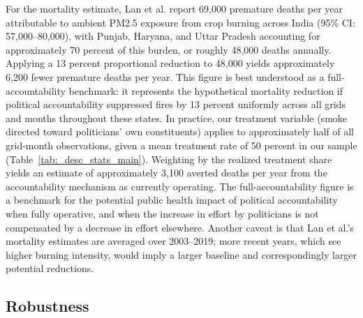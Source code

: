 \documentclass[12pt]{article}
\begin{document}
{For the mortality estimate, Lan et al. report 69,000 premature deaths per year attributable to ambient PM2.5 exposure from crop burning across India (95\% CI: 57,000–80,000), with Punjab, Haryana, and Uttar Pradesh accounting for approximately 70 percent of this burden, or roughly 48,000 deaths annually. Applying a 13 percent proportional reduction to 48,000 yields approximately 6,200 fewer premature deaths per year. This figure is best understood as a full-accountability benchmark: it represents the hypothetical mortality reduction if political accountability suppressed fires by 13 percent uniformly across all grids and months throughout these states. In practice, our treatment variable (smoke directed toward politicians' own constituents) applies to approximately half of all grid-month observations, given a mean treatment rate of 50 percent in our sample (Table~\ref{tab:_desc_stats_main}). Weighting by the realized treatment share yields an estimate of approximately 3,100 averted deaths per year from the accountability mechanism as currently operating. The full-accountability figure is a benchmark for the potential public health impact of political accountability when fully operative, and when the increase in effort by politicians is not compensated by a decrease in effort elsewhere. Another caveat is that Lan et al.'s mortality estimates are averaged over 2003–2019; more recent years, which see higher burning intensity, would imply a larger baseline and correspondingly larger potential reductions.



\newpage 
\subsection{Robustness}

}
\end{document}
